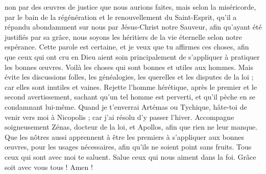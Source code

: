 \begin{multicols}{2}
non par des œuvres de justice que nous aurions faites, mais selon la miséricorde, par le bain de la régénération et le renouvellement du Saint-Esprit,
qu'il a répandu abondamment sur nous par Jésus-Christ notre Sauveur,
afin qu'ayant été justifiés par sa grâce, nous soyons les héritiers de la vie éternelle selon notre espérance.
Cette parole est certaine, et je veux que tu affirmes ces choses, afin que ceux qui ont cru en Dieu aient soin principalement de s'appliquer à pratiquer les bonnes œuvres. Voilà les choses qui sont bonnes et utiles aux hommes.
Mais évite les discussions folles, les généalogies, les querelles et les disputes de la loi ; car elles sont inutiles et vaines.
Rejette l'homme hérétique, après le premier et le second avertissement,
sachant qu'un tel homme est perverti, et qu'il pèche en se condamnant lui-même.
Quand je t'enverrai Artémas ou Tychique, hâte-toi de venir vers moi à Nicopolis ; car j'ai résolu d'y passer l'hiver.
Accompagne soigneusement Zénas, docteur de la loi, et Apollos, afin que rien ne leur manque.
Que les nôtres aussi apprennent à être les premiers à s'appliquer aux bonnes œuvres, pour les usages nécessaires, afin qu'ils ne soient point sans fruits.
Tous ceux qui sont avec moi te saluent. Salue ceux qui nous aiment dans la foi. Grâce soit avec vous tous ! Amen !
\PPE{}
\end{multicols}
